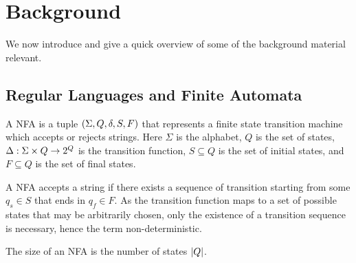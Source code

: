 
\section{Background}

We now introduce and give a quick overview of some of the background
material relevant.


\subsection{Regular Languages and Finite Automata}


A NFA is a tuple
\(\left(\Sigma, Q, \delta, S, F\right)\)
that represents a finite state transition machine
which accepts or rejects strings.
Here \(\Sigma\) is the alphabet,
\(Q\) is the set of states,
\(\Delta : \Sigma \times Q \to 2^{Q}\) is the transition function,
\(S \subseteq Q\) is the set of initial states,
and \(F \subseteq Q\) is the set of final states.

A NFA accepts a string if there exists a sequence of transition
starting from some \(q_s \in S\)
that ends in \(q_f \in F\).
As the transition function maps to a set of possible states that may
be arbitrarily chosen,
only the existence of a transition sequence is necessary,
hence the term non-deterministic.

The size of an NFA is the number of states \(\left\lvert Q\right\rvert\).

